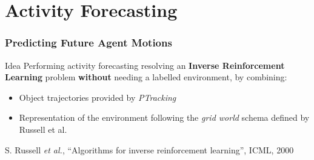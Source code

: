 \section{Activity Forecasting}

\logo
{
	\vspace{199.1pt}
}

\begin{frame}
	\frametitle{Predicting Future Agent Motions}
	
	\vspace{0.2cm}
	
	\begin{block}{Idea}
		Performing activity forecasting resolving an \textbf{Inverse Reinforcement Learning} problem
		\textbf{without} needing a labelled environment, by combining:
		\vspace{0.05cm}
		\begin{itemize}
			\item Object trajectories provided by \emph{PTracking}
			\item Representation of the environment following the \emph{grid world} schema defined by
				  Russell et al. \cite{Ng00}
		\end{itemize}
	\end{block}
	
	\vspace{-0.1cm}
	
	\begin{center}
	\end{center}
	
	\vspace{-0.34cm}
	
	\tiny
	
	\cite{Ng00} S. Russell \emph{et al.},  ``Algorithms for inverse reinforcement learning'', ICML,
	2000
\end{frame}

